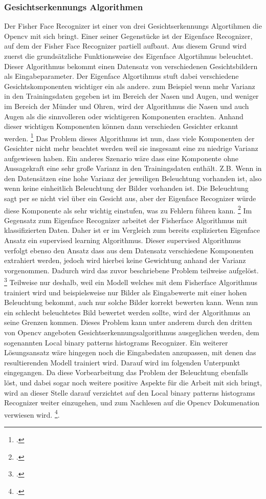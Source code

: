\documentclass[12pt, a4paper]{scrbook}
\begin{document}
\subsubsection{Gesichtserkennungs Algorithmen}
Der Fisher Face Recognizer ist einer von drei Gesichtserkennungs Algortihmen die Opencv mit sich bringt. Einer seiner Gegenstücke ist der Eigenface Recognizer, auf dem der Fisher Face Recognizer partiell aufbaut. Aus diesem Grund wird zuerst die grundsätzliche Funktionsweise des Eigenface Algortihmus beleuchtet. Dieser Algorithmus bekommt einen Datensatz von verschiedenen Gesichtsbildern als Eingabeparameter. Der Eigenface Algortihmus stuft dabei verschiedene Gesichtskomponenten wichtiger ein als andere. zum Beispiel wenn mehr Varianz in den Trainingsdaten gegeben ist im Bereich der Nasen und Augen, und weniger im Bereich der Münder und Ohren,  wird der Algorithmus die Nasen und auch Augen als die sinnvolleren oder wichtigeren Komponenten erachten. Anhand dieser wichtigen Komponenten können dann verschieden Gesichter erkannt werden.
\footcite[Vgl.][]{Eigenface}
Das Problem dieses Algorithmus ist nun, dass viele Komponenten der Gesichter nicht mehr beachtet werden weil sie insgesamt eine zu niedrige Varianz aufgewiesen haben. Ein anderes Szenario wäre dass eine Komponente ohne Aussagekraft eine sehr große Varianz in den Trainingsdaten enthält. Z.B. Wenn in den Datensätzen eine hohe Varianz der jeweiligen Beleuchtung vorhanden ist, also wenn keine einheitlich Beleuchtung der Bilder vorhanden ist. Die Beleuchtung sagt per se nicht viel über ein Gesicht aus, aber der Eigenface Recognizer würde diese Komponente als sehr wichtig einstufen, was zu Fehlern führen kann.
\footcite[Vgl.][]{Fisherface}
Im Gegensatz zum Eigenface Recognizer arbeitet der Fisherface Algorithmus mit klassifizierten Daten. Daher ist er im Vergleich zum bereits explizierten Eigenface Ansatz ein supervised learning Algorithmus. Dieser supervised Algorithmus verfolgt ebenso den Ansatz dass aus dem Datensatz verschiedene Komponenten extrahiert werden, jedoch wird hierbei keine Gewichtung anhand der Varianz vorgenommen. Dadurch wird das zuvor beschriebene Problem teilweise aufgelöst. 
\footcite[Vgl.][How to fix this issue]{Eigenface}
Teilweise nur deshalb, weil ein Modell welches mit dem Fisherface Algorithmus trainiert wird und beispielsweise nur Bilder als Eingabewerte mit einer hohen Beleuchtung bekommt, auch nur solche Bilder korrekt bewerten kann. Wenn nun ein schlecht beleuchtetes Bild bewertet werden sollte, wird der Algorithmus an seine Grenzen kommen.
Dieses Problem kann unter anderem durch den dritten von Opencv angeboten Gesichtserkennungsalgorithmus ausgeglichen werden, dem sogenannten Local binary patterns histograms Recognizer. Ein weiterer Lösungsansatz wäre hingegen noch die Eingabedaten anzupassen, mit denen das resultierenden Modell trainiert wird. Darauf wird im folgenden Unterpunkt \pageref{subsec: Eingabe Daten} eingegangen. Da diese Vorbearbeitung das Problem der Beleuchtung ebenfalls löst, und dabei sogar noch weitere positive Aspekte für die Arbeit mit sich bringt, wird an dieser Stelle darauf verzichtet auf den Local binary patterns histograms Recognizer weiter einzugehen, und zum Nachlesen auf die Opencv Dokumenation verwiesen wird. 
\footcite[Vgl.][]{Recognizer}. 
\end{document}
